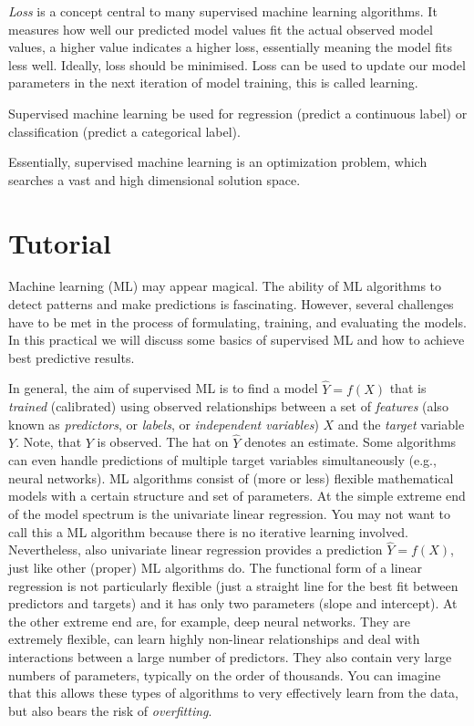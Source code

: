 \documentclass[
]{book}
\begin{document}
\emph{Loss} is a concept central to many supervised machine learning algorithms. It measures how well our predicted model values fit the actual observed model values, a higher value indicates a higher loss, essentially meaning the model fits less well. Ideally, loss should be minimised.
Loss can be used to update our model parameters in the next iteration of model training, this is called learning.

Supervised machine learning be used for regression (predict a continuous label) or classification (predict a categorical label).

Essentially, supervised machine learning is an optimization problem, which searches a vast and high dimensional solution space.

\hypertarget{tutorial-1}{%
\section{Tutorial}\label{tutorial-1}}

Machine learning (ML) may appear magical. The ability of ML algorithms to detect patterns and make predictions is fascinating. However, several challenges have to be met in the process of formulating, training, and evaluating the models. In this practical we will discuss some basics of supervised ML and how to achieve best predictive results.

In general, the aim of supervised ML is to find a model \(\hat{Y} = f(X)\) that is \emph{trained} (calibrated) using observed relationships between a set of \emph{features} (also known as \emph{predictors}, or \emph{labels}, or \emph{independent variables}) \(X\) and the \emph{target} variable \(Y\). Note, that \(Y\) is observed. The hat on \(\hat{Y}\) denotes an estimate. Some algorithms can even handle predictions of multiple target variables simultaneously (e.g., neural networks). ML algorithms consist of (more or less) flexible mathematical models with a certain structure and set of parameters. At the simple extreme end of the model spectrum is the univariate linear regression. You may not want to call this a ML algorithm because there is no iterative learning involved. Nevertheless, also univariate linear regression provides a prediction \(\hat{Y} = f(X)\), just like other (proper) ML algorithms do. The functional form of a linear regression is not particularly flexible (just a straight line for the best fit between predictors and targets) and it has only two parameters (slope and intercept). At the other extreme end are, for example, deep neural networks. They are extremely flexible, can learn highly non-linear relationships and deal with interactions between a large number of predictors. They also contain very large numbers of parameters, typically on the order of thousands. You can imagine that this allows these types of algorithms to very effectively learn from the data, but also bears the risk of \emph{overfitting}.
\end{document}
